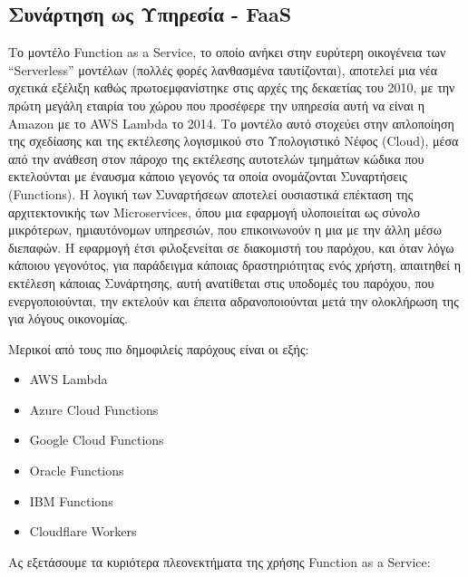 \documentclass{article}
\begin{document}
\subsection{Συνάρτηση ως Υπηρεσία - FaaS}
Το μοντέλο Function as a Service, το οποίο ανήκει στην ευρύτερη οικογένεια των “Serverless” μοντέλων (πολλές φορές λανθασμένα ταυτίζονται), αποτελεί μια νέα σχετικά εξέλιξη καθώς πρωτοεμφανίστηκε στις αρχές της δεκαετίας του 2010, με την πρώτη μεγάλη εταιρία του χώρου που προσέφερε την υπηρεσία αυτή να είναι η Amazon  με το  AWS Lambda το 2014. Το μοντέλο αυτό στοχεύει στην απλοποίηση της σχεδίασης και της εκτέλεσης λογισμικού στο Υπολογιστικό Νέφος (Cloud), μέσα από την ανάθεση στον πάροχο της εκτέλεσης αυτοτελών τμημάτων κώδικα που εκτελούνται με έναυσμα κάποιο γεγονός τα οποία ονομάζονται Συναρτήσεις (Functions). Η λογική των Συναρτήσεων αποτελεί ουσιαστικά επέκταση της αρχιτεκτονικής των Microservices, όπου μια εφαρμογή υλοποιείται ως σύνολο μικρότερων, ημιαυτόνομων υπηρεσιών, που επικοινωνούν η μια με την άλλη μέσω διεπαφών. Η εφαρμογή έτσι φιλοξενείται σε διακομιστή του παρόχου, και όταν λόγω κάποιου γεγονότος, για παράδειγμα κάποιας δραστηριότητας ενός χρήστη, απαιτηθεί η εκτέλεση κάποιας Συνάρτησης, αυτή ανατίθεται στις υποδομές του παρόχου, που ενεργοποιούνται, την εκτελούν και έπειτα αδρανοποιούνται μετά την ολοκλήρωση της για λόγους οικονομίας. 

Μερικοί από τους πιο δημοφιλείς παρόχους είναι οι εξής:
\begin{itemize}
\item AWS Lambda
\item Azure Cloud Functions
\item Google Cloud Functions
\item Oracle Functions
\item IBM Functions
\item Cloudflare Workers
\end{itemize}
Ας εξετάσουμε τα κυριότερα πλεονεκτήματα της χρήσης Function as a Service:
\end{document}
